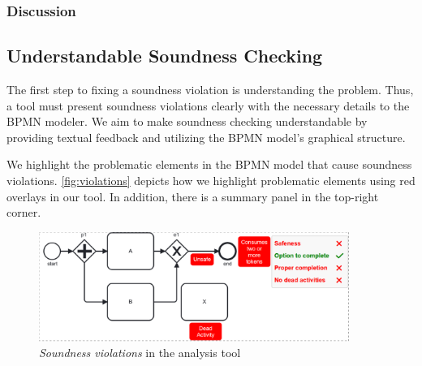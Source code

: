 \documentclass[runningheads]{llncs}
\begin{document}
\subsubsection{Discussion}



\subsection{Understandable Soundness Checking}

The first step to fixing a soundness violation is understanding the problem.
Thus, a tool must present soundness violations clearly with the necessary details to the BPMN modeler.
We aim to make soundness checking understandable by providing textual feedback and utilizing the BPMN model's graphical structure.

We highlight the problematic elements in the BPMN model that cause soundness violations.
\autoref{fig:violations} depicts how we highlight problematic elements using red overlays in our tool.
In addition, there is a summary panel in the top-right corner.

\begin{figure}[ht]
	\centering
	\includegraphics[width=0.9\textwidth]{images/violations}
	\caption{\textit{Soundness violations} in the analysis tool}
	\label{fig:violations}
\end{figure}
\end{document}
